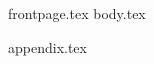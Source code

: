 \documentclass[11pt]{llncs}
\begin{document}
{frontpage.tex}
{body.tex}

\iflncs
  \thispagestyle{plain}
\fi

\ifccs
  
\fi
\iflncs
  
\fi
\ifoakland
  
\fi


{appendix.tex}
\end{document}
